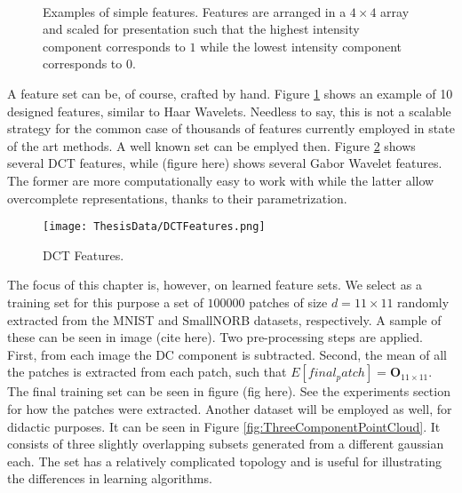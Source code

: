 \documentclass[12pt,a4paper,oneside,english]{UPBThesis}
\newcommand{\hctimes}[2]{{#1}\!\times\!{#2}}
\begin{document}
\begin{figure}
\centering
{}
~~~~~~
\caption{Examples of simple features. Features are arranged in a $\hctimes{4}{4}$ array and scaled for presentation such that the highest intensity component corresponds to $1$ while the lowest intensity component corresponds to $0$.}
\label{fig:RandomAndHandmadeFeatures}
\end{figure}


A feature set can be, of course, crafted by hand. Figure \ref{fig:RandomAndHandmadeFeatures} shows an example of 10 designed features, similar to Haar Wavelets. Needless to say, this is not a scalable strategy for the common case of thousands of features currently employed in state of the art methods. A well known set can be emplyed then. Figure \ref{fig:DCTFeatures} shows several DCT features, while (figure here) shows several Gabor Wavelet features. The former are more computationally easy to work with while the latter allow overcomplete representations, thanks to their parametrization.

\begin{figure}
\texttt{[image: ThesisData/DCTFeatures.png]}
\caption{DCT Features.}
\label{fig:DCTFeatures}
\end{figure}

The focus of this chapter is, however, on learned feature sets. We select as a training set for this purpose a set of $100000$ patches of size $d = \hctimes{11}{11}$ randomly extracted from the MNIST and SmallNORB datasets, respectively. A sample of these can be seen in image (cite here). Two pre-processing steps are applied. First, from each image the DC component is subtracted. Second, the mean of all the patches is extracted from each patch, such that $E[final_patch] = \textbf{O}_{\hctimes{11}{11}}$. The final training set can be seen in figure (fig here). See the experiments section for how the patches were extracted. Another dataset will be employed as well, for didactic purposes. It can be seen in Figure \ref{fig:ThreeComponentPointCloud}. It consists of three slightly overlapping subsets generated from a different gaussian each. The set has a relatively complicated topology and is useful for illustrating the differences in learning algorithms.
\end{document}
